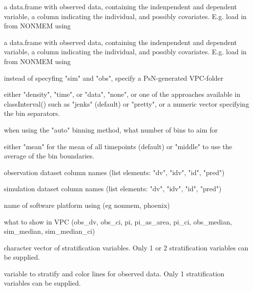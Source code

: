 \documentclass[letterpaper]{book}
\begin{document}
\begin{Arguments}
\begin{ldescription}
\item[\code{sim}] a data.frame with observed data, containing the indenpendent and dependent variable, a column indicating the individual, and possibly covariates. E.g. load in from NONMEM using 

\item[\code{obs}] a data.frame with observed data, containing the indenpendent and dependent variable, a column indicating the individual, and possibly covariates. E.g. load in from NONMEM using 

\item[\code{psn\_folder}] instead of specyfing "sim" and "obs", specify a PsN-generated VPC-folder

\item[\code{bins}] either "density", "time", or "data", "none", or one of the approaches available in classInterval() such as "jenks" (default) or "pretty", or a numeric vector specifying the bin separators.

\item[\code{n\_bins}] when using the "auto" binning method, what number of bins to aim for

\item[\code{bin\_mid}] either "mean" for the mean of all timepoints (default) or "middle" to use the average of the bin boundaries.

\item[\code{obs\_cols}] observation dataset column names (list elements: "dv", "idv", "id", "pred")

\item[\code{sim\_cols}] simulation dataset column names (list elements: "dv", "idv", "id", "pred")

\item[\code{software}] name of software platform using (eg nonmem, phoenix)

\item[\code{show}] what to show in VPC (obs\_dv, obs\_ci, pi, pi\_as\_area, pi\_ci, obs\_median, sim\_median, sim\_median\_ci)

\item[\code{stratify}] character vector of stratification variables. Only 1 or 2 stratification variables can be supplied.

\item[\code{stratify\_color}] variable to stratify and color lines for observed data. Only 1 stratification variables can be supplied.


\end{ldescription}
\end{Arguments}
\end{document}
